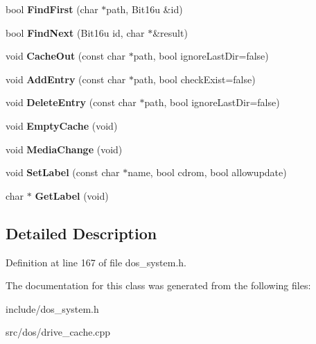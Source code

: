 \begin{DoxyCompactItemize}
\item 
\hypertarget{classDOS__Drive__Cache_ae19e2c7e6730d76b492bbc62d0edb38f}{bool {\bfseries Find\-First} (char $\ast$path, Bit16u \&id)}\label{classDOS__Drive__Cache_ae19e2c7e6730d76b492bbc62d0edb38f}

\item 
\hypertarget{classDOS__Drive__Cache_a8c3297b5ea4a5b10ccf1e9bfd6e4b2c6}{bool {\bfseries Find\-Next} (Bit16u id, char $\ast$\&result)}\label{classDOS__Drive__Cache_a8c3297b5ea4a5b10ccf1e9bfd6e4b2c6}

\item 
\hypertarget{classDOS__Drive__Cache_ac1cf68069ab790fb1b3a35686b3625c6}{void {\bfseries Cache\-Out} (const char $\ast$path, bool ignore\-Last\-Dir=false)}\label{classDOS__Drive__Cache_ac1cf68069ab790fb1b3a35686b3625c6}

\item 
\hypertarget{classDOS__Drive__Cache_a88416281f2c92dbd802bf1cc77153bdb}{void {\bfseries Add\-Entry} (const char $\ast$path, bool check\-Exist=false)}\label{classDOS__Drive__Cache_a88416281f2c92dbd802bf1cc77153bdb}

\item 
\hypertarget{classDOS__Drive__Cache_a68d34280ef1d383e84f98f2df46de333}{void {\bfseries Delete\-Entry} (const char $\ast$path, bool ignore\-Last\-Dir=false)}\label{classDOS__Drive__Cache_a68d34280ef1d383e84f98f2df46de333}

\item 
\hypertarget{classDOS__Drive__Cache_a37fc4a803fa8ac753d3e084ee52e0daf}{void {\bfseries Empty\-Cache} (void)}\label{classDOS__Drive__Cache_a37fc4a803fa8ac753d3e084ee52e0daf}

\item 
\hypertarget{classDOS__Drive__Cache_a6015de7335a108069e32a1fdebfcd890}{void {\bfseries Media\-Change} (void)}\label{classDOS__Drive__Cache_a6015de7335a108069e32a1fdebfcd890}

\item 
\hypertarget{classDOS__Drive__Cache_af5f0e25edd0f18d6ccaeb7349ec412a3}{void {\bfseries Set\-Label} (const char $\ast$name, bool cdrom, bool allowupdate)}\label{classDOS__Drive__Cache_af5f0e25edd0f18d6ccaeb7349ec412a3}

\item 
\hypertarget{classDOS__Drive__Cache_a5226fd65de22dc1ed73103dce3b6d668}{char $\ast$ {\bfseries Get\-Label} (void)}\label{classDOS__Drive__Cache_a5226fd65de22dc1ed73103dce3b6d668}

\end{DoxyCompactItemize}


\subsection{Detailed Description}


Definition at line 167 of file dos\-\_\-system.\-h.



The documentation for this class was generated from the following files\-:\begin{DoxyCompactItemize}
\item 
include/dos\-\_\-system.\-h\item 
src/dos/drive\-\_\-cache.\-cpp\end{DoxyCompactItemize}
